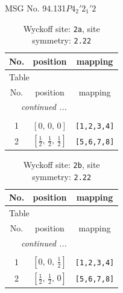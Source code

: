 \documentclass[fleqn,8pt]{jsarticle}
\begin{document}
\setcounter{MaxMatrixCols}{32}

\renewcommand{\tablename}{Table~}
\renewcommand{\figurename}{Figure~}
\begin{center}
\LARGE
MSG No. 94.131\quad$P4_{2}'2_{1}'2$
\end{center}
\renewcommand{\arraystretch}{1.2}
\begin{longtable}{ccc}
\caption{Wyckoff site: {\tt 2a}, site symmetry: {\tt 2.22}}
 \\
 \hline \hline
No. & position & mapping \\ \hline \endfirsthead

\multicolumn{2}{l}{\tablename\ \thetable{}} \\
 \hline \hline
No. & position & mapping \\ \hline \endhead

 \hline \hline
\multicolumn{2}{r}{\footnotesize\it continued ...} \\ \endfoot

 \hline \hline
\multicolumn{2}{r}{} \\ \endlastfoot

1 & $\left[ 0,\, 0,\, 0 \right]$ & {\tt [1,2,3,4]} \\ \hline
2 & $\left[ \frac{1}{2},\, \frac{1}{2},\, \frac{1}{2} \right]$ & {\tt [5,6,7,8]} \\
\end{longtable}
\renewcommand{\arraystretch}{1.2}
\begin{longtable}{ccc}
\caption{Wyckoff site: {\tt 2b}, site symmetry: {\tt 2.22}}
 \\
 \hline \hline
No. & position & mapping \\ \hline \endfirsthead

\multicolumn{2}{l}{\tablename\ \thetable{}} \\
 \hline \hline
No. & position & mapping \\ \hline \endhead

 \hline \hline
\multicolumn{2}{r}{\footnotesize\it continued ...} \\ \endfoot

 \hline \hline
\multicolumn{2}{r}{} \\ \endlastfoot

1 & $\left[ 0,\, 0,\, \frac{1}{2} \right]$ & {\tt [1,2,3,4]} \\ \hline
2 & $\left[ \frac{1}{2},\, \frac{1}{2},\, 0 \right]$ & {\tt [5,6,7,8]} \\
\end{longtable}
\end{document}
